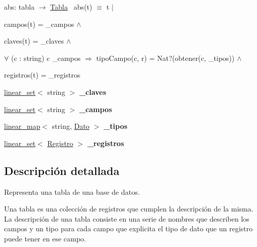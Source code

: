 \begin{Indent}
{abs\+: tabla $\to$ \mbox{\hyperlink{classTabla}{Tabla}}~\newline
abs(t) $\equiv$ t\textquotesingle{} $|$
\begin{DoxyItemize}
\item campos(t\textquotesingle{}) = \+\_\+campos $\land$
\item claves(t\textquotesingle{}) = \+\_\+claves $\land$
\item $\forall$ (c \+: string) c  \+\_\+campos $\Rightarrow$ tipo\+Campo(c, r\textquotesingle{}) = Nat?(obtener(c, \+\_\+tipos)) $\land$
\item registros(t\textquotesingle{}) = \+\_\+registros 
\end{DoxyItemize}}\begin{DoxyCompactItemize}
\item 
\mbox{\label{classTabla_a3fc11c070caf35a44a23724a6a5bae92}} 
\mbox{\hyperlink{classlinear__set}{linear\+\_\+set}}$<$ string $>$ {\bfseries \+\_\+claves}
\item 
\mbox{\label{classTabla_ac527baaf100aea820dd4d1687b0f2378}} 
\mbox{\hyperlink{classlinear__set}{linear\+\_\+set}}$<$ string $>$ {\bfseries \+\_\+campos}
\item 
\mbox{\label{classTabla_af3bc6468c890f3c0ea110f45377abf51}} 
\mbox{\hyperlink{classlinear__map}{linear\+\_\+map}}$<$ string, \mbox{\hyperlink{classDato}{Dato}} $>$ {\bfseries \+\_\+tipos}
\item 
\mbox{\label{classTabla_a28b3aa83e48d95fbeb5a6308a58defcc}} 
\mbox{\hyperlink{classlinear__set}{linear\+\_\+set}}$<$ \mbox{\hyperlink{classRegistro}{Registro}} $>$ {\bfseries \+\_\+registros}
\end{DoxyCompactItemize}
\end{Indent}


\subsection{Descripción detallada}
Representa una tabla de una base de datos. 

Una tabla es una colección de registros que cumplen la descripción de la misma. La descripción de una tabla consiste en una serie de nombres que describen los campos y un tipo para cada campo que explicita el tipo de dato que un registro puede tener en ese campo.

